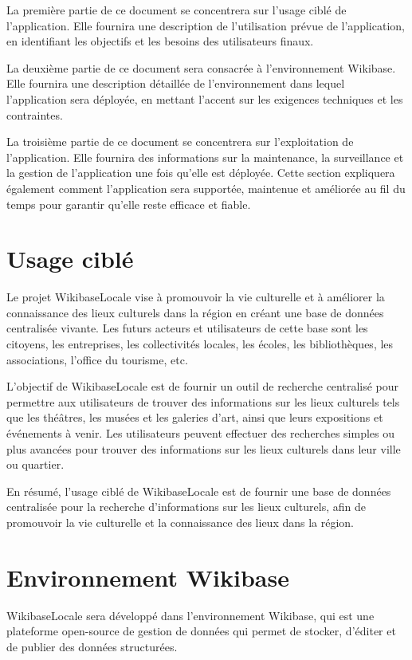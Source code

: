 \documentclass[a4paper, 12pt]{article}
\begin{document}
La première partie de ce document se concentrera sur l'usage ciblé de l'application. Elle fournira une description de l'utilisation prévue de l'application, en identifiant les objectifs et les besoins des utilisateurs finaux.

La deuxième partie de ce document sera consacrée à l'environnement Wikibase. Elle fournira une description détaillée de l'environnement dans lequel l'application sera déployée, en mettant l'accent sur les exigences techniques et les contraintes.

La troisième partie de ce document se concentrera sur l'exploitation de l'application. Elle fournira des informations sur la maintenance, la surveillance et la gestion de l'application une fois qu'elle est déployée. Cette section expliquera également comment l'application sera supportée, maintenue et améliorée au fil du temps pour garantir qu'elle reste efficace et fiable.


\section{Usage ciblé}

Le projet WikibaseLocale vise à promouvoir la vie culturelle et à améliorer la connaissance des lieux culturels dans la région en créant une base de données centralisée vivante. Les futurs acteurs et utilisateurs de cette base sont les citoyens, les entreprises, les collectivités locales, les écoles, les bibliothèques, les associations, l'office du tourisme, etc.

L'objectif de WikibaseLocale est de fournir un outil de recherche centralisé pour permettre aux utilisateurs de trouver des informations sur les lieux culturels tels que les théâtres, les musées et les galeries d'art, ainsi que leurs expositions et événements à venir. Les utilisateurs peuvent effectuer des recherches simples ou plus avancées pour trouver des informations sur les lieux culturels dans leur ville ou quartier.

En résumé, l'usage ciblé de WikibaseLocale est de fournir une base de données centralisée pour la recherche d'informations sur les lieux culturels, afin de promouvoir la vie culturelle et la connaissance des lieux dans la région.

\section{Environnement Wikibase}

WikibaseLocale sera développé dans l'environnement Wikibase, qui est une plateforme open-source de gestion de données qui permet de stocker, d'éditer et de publier des données structurées.
\end{document}
